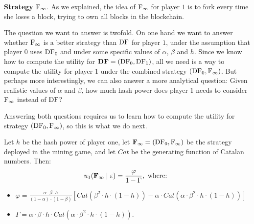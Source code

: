 \medskip
\noindent
\textbf{Strategy ${\rm {F_\infty}}$}. As we explained, the idea of ${\rm {F_\infty}}$ for player $1$ is to fork every time she loses a block, trying to own all blocks in the blockchain. 

The question we want to answer is twofold. On one hand we want to answer whether ${\rm {F_\infty}}$ is a better strategy than $\text{\rm DF}$ for player $1$, under the assumption that player $0$ uses $\text{\rm DF}_0$ and under some specific values of $\alpha$, $\beta$ and $h$. Since we know how to compute the utility for $\text{\rm {\bf DF}} = (\text{\rm DF}_0,\text{\rm DF}_1)$, all we need is a way to compute the utility for player $1$ under the combined strategy $(\text{\rm DF}_0,{\rm {F_\infty}})$. But perhaps more interestingly, we can also answer a more analytical question: Given realistic values of $\alpha$ and $\beta$, how much hash power does player $1$ needs to consider ${\rm {F_\infty}}$ instead of $\text{\rm DF}$? 

Answering both questions requires us to learn how to compute the utility for strategy $(\text{\rm DF}_0,{\rm {F_\infty}})$, so this is what we do next. 

\begin{theorem}\label{thm:always_fork}
Let $h$ be the hash power of player one, let ${\rm {\bf F_\infty}}=(\text{\rm DF}_0,{\rm {F_\infty}})$ be the strategy deployed in the mining game, and let $Cat$ be the generating function of Catalan numbers. Then:
$$u_1({\rm {\bf F_\infty}}\mid\varepsilon) = \frac{\varphi}{1-\Gamma}, \text{ where: }$$
\begin{itemize}
\item $\varphi = \frac{\alpha \cdot \beta \cdot h }{(1-\alpha)\cdot (1-\beta)}[Cat(\beta^2 \cdot h \cdot (1-h))-\alpha\cdot Cat(\alpha\cdot \beta^2 \cdot h \cdot (1-h))]$
\item $\Gamma = \alpha \cdot \beta \cdot h \cdot Cat(\alpha\cdot \beta^2 \cdot h \cdot (1-h))$.
\end{itemize}
\end{theorem}




